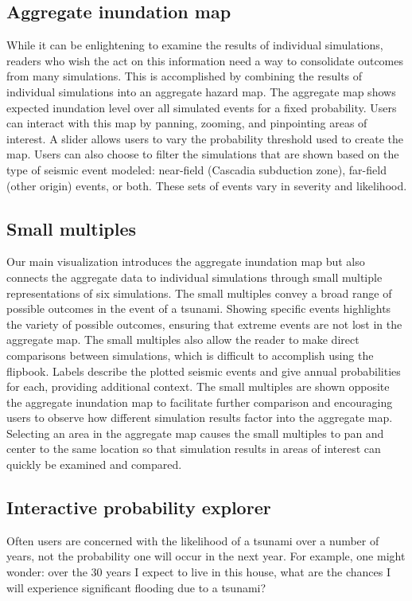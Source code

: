 \documentclass{vgtc}                          %
\begin{document}
\subsection{Aggregate inundation map}\label{sec:aggregate-map}
While it can be enlightening to examine the results of individual simulations, readers who wish the act on this information need a way to consolidate outcomes from many simulations. This is accomplished by combining the results of individual simulations into an aggregate hazard map. The aggregate map shows expected inundation level over all simulated events for a fixed probability. Users can interact with this map by panning, zooming, and pinpointing areas of interest. A slider allows users to vary the probability threshold used to create the map.
Users can also choose to filter the simulations that are shown based on the type of seismic event modeled: near-field (Cascadia subduction zone), far-field (other origin) events, or both. These sets of events vary in severity and likelihood.

\subsection{Small multiples}\label{sec:small-multiples}
Our main visualization introduces the aggregate inundation map but also connects the aggregate data to individual simulations through small multiple representations of six simulations. The small multiples convey a broad range of possible outcomes in the event of a tsunami. Showing specific events highlights the variety of possible outcomes, ensuring that extreme events are not lost in the aggregate map. The small multiples also allow the reader to make direct comparisons between simulations, which is difficult to accomplish using the flipbook. Labels describe the plotted seismic events and give annual probabilities for each, providing additional context. The small multiples are shown opposite the aggregate inundation map to facilitate further comparison and encouraging users to observe how different simulation results factor into the aggregate map. Selecting an area in the aggregate map causes the small multiples to pan and center to the same location so that simulation results in areas of interest can quickly be examined and compared.



\subsection{Interactive probability explorer}\label{sec:prob-explorer}
Often users are concerned with the likelihood of a tsunami over a number of years, not the probability one will occur in the next year. For example, one might wonder: over the 30 years I expect to live in this house, what are the chances I will experience significant flooding due to a tsunami?
\end{document}
